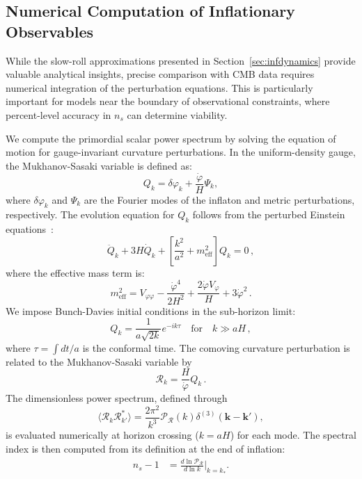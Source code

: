 \documentclass[aps,prev,twocolumn,preprintnumbers,floatfix,nofootinbib]{revtex4-1}
\begin{document}
\subsection{Numerical Computation of Inflationary Observables}
\label{appC}
\setcounter{equation}{0}

While the slow-roll approximations presented in Section~\ref{sec:infdynamics} provide valuable analytical insights, precise comparison with CMB data requires numerical integration of the perturbation equations. This is particularly important for models near the boundary of observational constraints, where percent-level accuracy in $n_s$ can determine viability.

We compute the primordial scalar power spectrum by solving the equation of motion for gauge-invariant curvature perturbations. In the uniform-density gauge, the Mukhanov-Sasaki variable is defined as:
\begin{equation}
Q_k = \delta\varphi_k + \frac{\dot{\varphi}}{H}\Psi_k,
\end{equation}
where $\delta\varphi_k$ and $\Psi_k$ are the Fourier modes of the inflaton and metric perturbations, respectively. The evolution equation for $Q_k$ follows from the perturbed Einstein equations~\cite{Lalak:2007vi,egno3}:
\begin{equation}
\label{eq:MSeq}
\ddot{Q}_k + 3H\dot{Q}_k + \left[\frac{k^2}{a^2} + m_{\text{eff}}^2\right]Q_k = 0 \, ,
\end{equation}
where the effective mass term is:
\begin{equation}
m_{\text{eff}}^2 = V_{\varphi\varphi} - \frac{\dot{\varphi}^4}{2 H^2} + \frac{2\dot{\varphi}V_{\varphi}}{ H} + 3\dot{\varphi}^2 \,.
\end{equation}
We impose Bunch-Davies initial conditions in the sub-horizon limit:
\begin{equation}
Q_k = \frac{1}{a\sqrt{2k}}e^{-ik\tau} \quad \text{for} \quad k \gg aH \, ,
\end{equation}
where $\tau = \int dt/a$ is the conformal time. The comoving curvature perturbation is related to the Mukhanov-Sasaki variable by
\begin{equation}
\mathcal{R}_k = \frac{H}{\dot{\varphi}}Q_k \,.
\end{equation}
The dimensionless power spectrum, defined through
\begin{equation}
\langle\mathcal{R}_k\mathcal{R}_{k'}^*\rangle = \frac{2\pi^2}{k^3}\mathcal{P}_{\mathcal{R}}(k)\delta^{(3)}(\mathbf{k} - \mathbf{k'}),
\end{equation}
is evaluated numerically at horizon crossing ($k = aH$) for each mode. The spectral index is then computed from its definition at the end of inflation:
\begin{align}
\label{eq:nsdef}
n_s - 1 &= \frac{d\ln\mathcal{P}_{\mathcal{R}}}{d\ln k}\bigg|_{k=k_*}.
\end{align}
\end{document}
